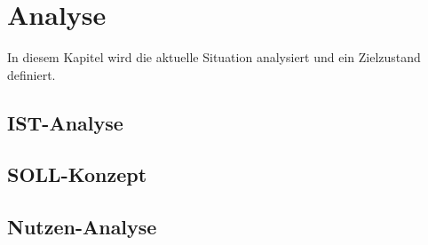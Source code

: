 \chapter{Analyse}
In diesem Kapitel wird die aktuelle Situation analysiert und ein Zielzustand definiert.

\section{IST-Analyse}
\lipsum[1]

\section{SOLL-Konzept}
\lipsum[1]


\section{Nutzen-Analyse}
\lipsum[1]